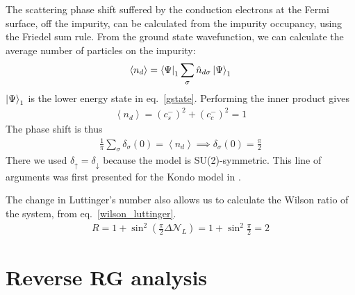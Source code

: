 The scattering phase shift suffered by the conduction electrons at the Fermi surface, off the impurity, can be calculated from the impurity occupancy, using the Friedel sum rule. From the ground state wavefunction, we can calculate the average number of particles on the impurity:
\begin{equation}\begin{aligned}
	\left<n_d \right> = \bra{\Psi}_1\sum_\sigma \hat n_{d\sigma} \ket{\Psi}_1
\end{aligned}\end{equation}
\(\ket{\Psi}_1\) is the lower energy state in eq.~\eqref{gstate}. Performing the inner product gives
\begin{equation}\begin{aligned}
	\left<n_d \right> = \left( c_s^- \right)^2 + \left( c_c^- \right)^2 = 1
\end{aligned}\end{equation}
The phase shift is thus
\begin{equation}\begin{aligned}
	\frac{1}{\pi}\sum_\sigma \delta_\sigma(0) = \left<n_d \right> \implies \delta_\sigma(0) = \frac{\pi}{2}
\end{aligned}\end{equation}
There we used \(\delta_\uparrow = \delta_\downarrow\) because the model is SU(2)-symmetric. This line of arguments was first presented for the Kondo model in \cite{martin1982fermi}.

The change in Luttinger's number also allows us to calculate the Wilson ratio of the system, from eq.~\eqref{wilson_luttinger}.
\begin{equation}\begin{aligned}
	R = 1 + \sin^2 \left( \frac{\pi}{2}\Delta \mathcal{N}_L \right) = 1 + \sin^2 \frac{\pi}{2} = 2
\end{aligned}\end{equation}
\section{Reverse RG analysis}\label{rev_rg}

